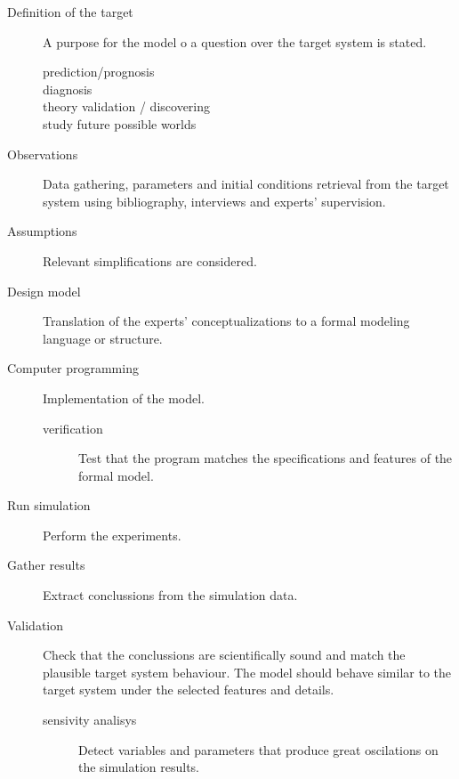 \documentclass{report}
\begin{document}
\begin{description}
\renewcommand{\labelitemi}{$\bullet$}
\renewcommand{\labelitemii}{$\cdot$}
\item [Definition of the target] A purpose for the model o a question over the target system is stated.
	\begin{description}
	\item [prediction/prognosis]
	\item [diagnosis]
	\item [theory validation / discovering]
	\item [study future possible worlds]
	\end{description}
\item [Observations] Data gathering, parameters and initial conditions retrieval from the target system using bibliography, interviews and experts' supervision.
\item [Assumptions] Relevant simplifications are considered. 
\item [Design model] Translation of the experts' conceptualizations to a formal modeling language or structure. 
\item [Computer programming] Implementation of the model.
	\begin{description}
	\item [verification] Test that the program matches the specifications and features of the formal model.
	\end{description}
\item [Run simulation] Perform the experiments.
\item [Gather results] Extract conclussions from the simulation data. 
\item [Validation] Check that the conclussions are scientifically sound and match the plausible target system behaviour. The model should behave similar to the target system under the selected features and details.
	\begin{description}
	\item [sensivity analisys] Detect variables and parameters that produce great oscilations on the simulation results.
	\end{description}
\end{description}
\end{document}
